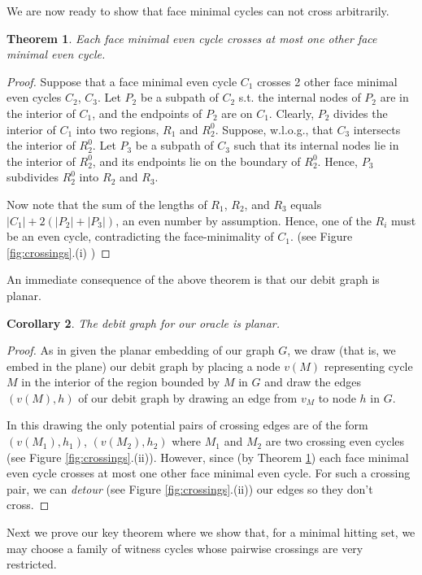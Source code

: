 \documentclass[letterpaper,11pt]{article}
\newtheorem{theorem}{Theorem}[section]
\newtheorem{cor}[theorem]{Corollary}
\newcommand{\0}{\mathbb{0}}
\newcommand{\1}{\mathbb{1}}
\begin{document}
We are now ready to show that face minimal cycles can not cross
arbitrarily. 

\begin{theorem}\label{1cross}
Each face minimal even cycle crosses at most one other face minimal even cycle.
\end{theorem}
\begin{proof}
Suppose that a face minimal even cycle $C_1$ crosses 2 other face minimal even cycles $C_2$, $C_3$.
Let $P_2$ be a subpath of $C_2$ s.t. the internal nodes of $P_2$ are in the interior of $C_1$, and the endpoints of $P_2$ are on $C_1$. Clearly, $P_2$ divides the interior of $C_1$ into two regions, $R_1$ and $R^0_2$. Suppose, w.l.o.g., that $C_3$ intersects the interior of $R^0_2$. Let $P_3$ be a subpath of $C_3$ such that its internal nodes lie in the interior of $R^0_2$, and its endpoints lie on the boundary of $R^0_2$. Hence, $P_3$ subdivides $R^0_2$ into $R_2$ and $R_3$.

Now note that the sum of the lengths of $R_1$, $R_2$, and $R_3$ equals $|C_1| +2(|P_2|+|P_3|)$, an even number by assumption. Hence, one of the $R_i$ must be an even cycle, contradicting the face-minimality of $C_1$. (see Figure \ref{fig:crossings}.(i) )
\end{proof}

An immediate consequence of the above theorem is that our debit graph
is planar. 

\begin{cor}
The debit graph for our oracle is planar.
\end{cor}
\begin{proof}
As in \cite{GW98} given the planar embedding of our graph $G$,  we draw (that is, we embed in the plane) our  debit graph  by placing a  node  $v(M)$ representing cycle $M$  in the interior of the region bounded by $M$  in $G$   and draw the edges $(v(M),h) $  of our debit graph by drawing an edge from  $v_M$ to node $h$  in $G$. 

In this drawing the only potential pairs of crossing edges are of the
form $ (v(M_1),h_1)$, $(v(M_2),h_2)$ where $M_1$ and $M_2$ are two
crossing even cycles (see Figure \ref{fig:crossings}.(ii)). However, since (by
Theorem \ref{1cross}) each face minimal even cycle crosses at most one
other face minimal even cycle. For such a crossing pair, we can {\em
  detour} (see Figure \ref{fig:crossings}.(ii)) our edges so they don't cross.
\end{proof}

Next we prove our key theorem where we show that, for a minimal hitting set, we may choose a family of witness cycles whose pairwise crossings are very restricted.  
\end{document}
